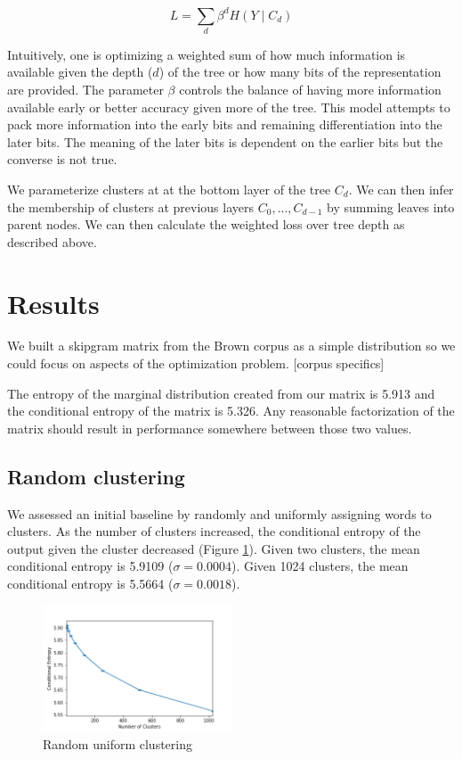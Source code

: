 \documentclass[11pt,letterpaper]{article}
\begin{document}
$$ L = \sum_d \beta ^ d  H(Y \mid C_d) $$

Intuitively, one is optimizing a weighted sum of how much information is available given the depth ($d$) of the tree or how many bits of the representation are provided. The parameter $\beta$ controls the balance of having more information available early or better accuracy given more of the tree. This model attempts to pack more information into the early bits and remaining differentiation into the later bits. The meaning of the later bits is dependent on the earlier bits but the converse is not true.

We parameterize clusters at at the bottom layer of the tree $C_d$. We can then infer the membership of clusters at previous layers $C_0,...,C_{d-1}$ by summing leaves into parent nodes. We can then calculate the weighted loss over tree depth as described above.

\section{Results}

We built a skipgram matrix from the Brown corpus as a simple distribution so we could focus on aspects of the optimization problem. [corpus specifics]

The entropy of the marginal distribution created from our matrix is 5.913 and the conditional entropy of the matrix is 5.326. Any reasonable factorization of the matrix should result in performance somewhere between those two values.

\subsection{Random clustering}

We assessed an initial baseline by randomly and uniformly assigning words to clusters. As the number of clusters increased, the conditional entropy of the output given the cluster decreased (Figure \ref{f:random}). Given two clusters, the mean conditional entropy is 5.9109 ($\sigma=0.0004$). Given 1024 clusters, the mean conditional entropy is 5.5664 ($\sigma=0.0018$).

\begin{figure}
  \caption{Random uniform clustering}
\label{f:random}
  \centering
    \includegraphics[width=0.5\textwidth]{random.png}
\end{figure}
\end{document}
